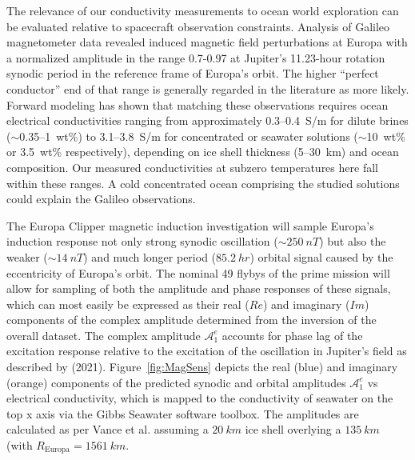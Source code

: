 \documentclass[journal=aesccq,manuscript=article]{achemso}
\begin{document}
The relevance of our conductivity measurements to ocean world exploration can be evaluated relative to spacecraft observation constraints. 
Analysis of Galileo magnetometer data revealed induced magnetic field perturbations at Europa with a normalized amplitude in the range 0.7-0.97 at Jupiter's 11.23-hour rotation synodic period in the reference frame of Europa's orbit\citep{kivelson2000galileo,zimmer2000subsurface}. 
The higher ``perfect conductor'' end of that range is generally regarded in the literature as more likely. 
Forward modeling \citet{vance2021magnetic} has shown that matching these observations requires ocean electrical conductivities ranging from approximately 0.3--0.4~S/m for dilute brines ($\sim$0.35--1~wt\%) to 3.1--3.8~S/m for concentrated  or seawater solutions ($\sim$10~wt\% or 3.5~wt\% respectively), depending on ice shell thickness (5--30~km) and ocean composition.
Our measured conductivities at subzero temperatures here fall within these ranges. A cold concentrated ocean comprising the studied solutions could explain the Galileo observations.

The Europa Clipper magnetic induction investigation will sample Europa's induction response not only strong synodic oscillation ($\sim\SI{250}{nT}$) but also the weaker ($\sim\SI{14}{nT}$) and much longer period ($\SI{85.2}{hr}$) orbital signal caused by the eccentricity of Europa's orbit\citep{kivelsonv2023europa}. 
The nominal 49 flybys of the prime mission will allow for sampling of both the amplitude and phase responses of these signals, which can most easily be expressed as their real ($Re$) and imaginary ($Im$) components of the complex amplitude determined from the inversion of the overall dataset. 
The complex amplitude $\mathcal{A}_1^e$ accounts for phase lag of the excitation response relative to the excitation of the oscillation in Jupiter's field as described by \citeauthor{vance2021magnetic} (2021). 
Figure~\ref{fig:MagSens} depicts the real (blue) and imaginary (orange) components of the predicted synodic and orbital amplitudes $\mathcal{A}_1^e$ vs electrical conductivity, which is mapped to the conductivity of seawater on the top x axis via the Gibbs Seawater software toolbox\cite{mcdougall2011getting}.
The amplitudes are calculated as per Vance et al.\cite{vance2021magnetic} assuming a $\SI{20}{km}$ ice shell overlying a $\SI{135}{km}$ (with $R_\mathrm{Europa}=\SI{1561}{km}$.
\end{document}
